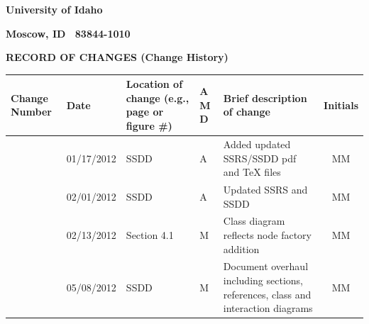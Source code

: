 \documentclass[twoside,letterpaper]{article}
\begin{document}
{\centering\bfseries University of Idaho \par}

{\centering\bfseries Moscow, ID \ 83844-1010 \par}






{\centering{}\bfseries\color{black}
RECORD OF CHANGES (Change History)
\par}



\begin{flushleft}
\tablehead{}
\begin{supertabular}[c]{|m{0.75in}|m{1.0in}|m{1.5in}|m{0.25in}|m{2in}|c|}
\hline

\centering \bfseries Change
\centering \bfseries Number
&

\centering \bfseries Date
\par
&

\centering \bfseries Location of change\newline
\centering \bfseries(e.g., page or figure \#)
&

\centering \bfseries A\newline
\centering \bfseries M\newline
\centering \bfseries D  
&

\centering \bfseries Brief description\newline
\centering \bfseries of change
&
\bfseries Initials

\\\hline
{}
& 01/17/2012
& SSDD
& \centering A
& Added updated SSRS/SSDD pdf and TeX files
& MM

\\\hline
{}
& 02/01/2012
& SSDD 
& \centering A
& Updated SSRS and SSDD
& MM

\\\hline
{}
& 02/13/2012
& Section 4.1
& \centering M
& Class diagram reflects node factory addition
& MM

\\\hline
{}
& 05/08/2012
& SSDD
& \centering M
& Document overhaul including sections, references, class and interaction diagrams
& MM

\\\hline
\end{supertabular}
\end{flushleft}
\end{document}
